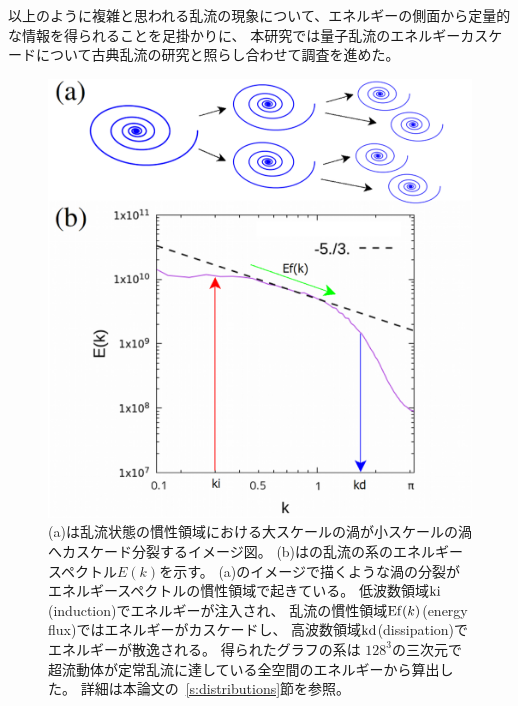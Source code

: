 \documentclass[12pt,a4paper]{jbook}
\begin{document}
        以上のように複雑と思われる乱流の現象について、エネルギーの側面から定量的な情報を得られることを足掛かりに、
        本研究では量子乱流のエネルギーカスケードについて古典乱流の研究と照らし合わせて調査を進めた。
        \begin{figure}[H]
            \centering
            \includegraphics[width=15cm]{spectrum.eps}
            \caption{
                (a)は乱流状態の慣性領域における大スケールの渦が小スケールの渦へカスケード分裂するイメージ図。
                (b)はの乱流の系のエネルギースペクトル$E(k)$を示す。
                (a)のイメージで描くような渦の分裂がエネルギースペクトルの慣性領域で起きている。
                低波数領域${\rm ki}$(induction)でエネルギーが注入され、
                乱流の慣性領域${\rm Ef}(k)$(energy flux)ではエネルギーがカスケードし、
                高波数領域$\rm{kd}$(dissipation)でエネルギーが散逸される。
                得られたグラフの系は
                $128^3$の三次元で超流動体が定常乱流に達している全空間のエネルギーから算出した。
                詳細は本論文の~\ref{s:distributions}節を参照。
            }
            \label{FIG:spectrum}
        \end{figure}
\end{document}
